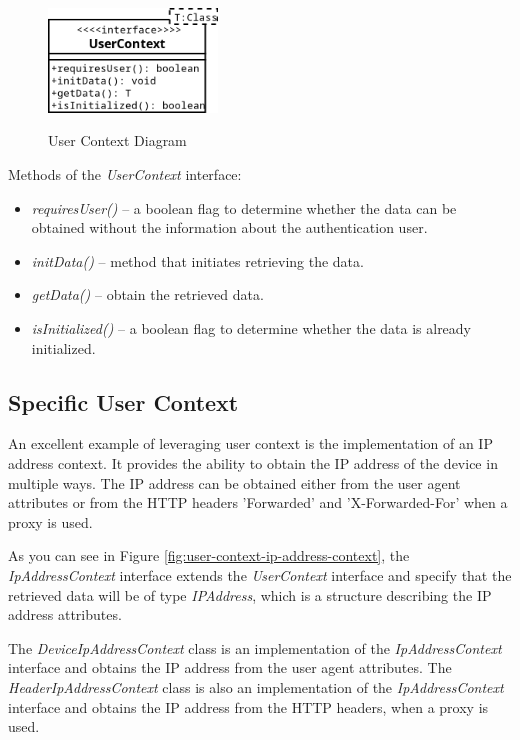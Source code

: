 \begin{figure}[htbp]
  \centering
  \includegraphics[width=0.4\textwidth]{img/sections/5-design/userContext.png}
  \label{fig:user-context-diagram}
  \caption{User Context Diagram}
\end{figure}

Methods of the \textit{UserContext} interface:
\begin{itemize}
    \item \textit{requiresUser()} -- a boolean flag to determine whether the data can be obtained without the information about the authentication user.
    \item \textit{initData()} -- method that initiates retrieving the data.
    \item \textit{getData()} -- obtain the retrieved data. 
    \item \textit{isInitialized()} -- a boolean flag to determine whether the data is already initialized. 
\end{itemize}

\newpage

\subsection{Specific User Context}
An excellent example of leveraging user context is the implementation of an IP address context.
It provides the ability to obtain the IP address of the device in multiple ways.
The IP address can be obtained either from the user agent attributes or from the HTTP headers 'Forwarded' and 'X-Forwarded-For' when a proxy is used.

As you can see in Figure \ref{fig:user-context-ip-address-context}, the \textit{IpAddressContext} interface extends the \textit{UserContext} interface and specify that the retrieved data will be of type \textit{IPAddress}, which is a structure describing the IP address attributes.

The \textit{DeviceIpAddressContext} class is an implementation of the \textit{IpAddressContext} interface and obtains the IP address from the user agent attributes.
The \textit{HeaderIpAddressContext} class is also an implementation of the \textit{IpAddressContext} interface and obtains the IP address from the HTTP headers, when a proxy is used.

